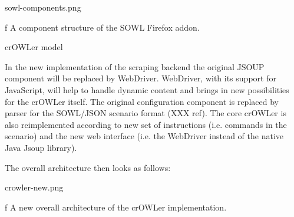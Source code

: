 \midinsert
\picw=12cm \cinspic sowl-components.png
\caption/f A component structure of the SOWL Firefox addon. 
\endinsert


\secc crOWLer model

In the new implementation of the scraping backend the original JSOUP component
will be replaced by WebDriver. WebDriver, with its support for JavaScript,
will help to handle dynamic content and brings in new possibilities for the
crOWLer itself. The original configuration component is replaced by parser for
the SOWL/JSON scenario format (XXX ref).  The core crOWLer is also
reimplemented according to new set of instructions (i.e. commands in the
scenario) and the new web interface (i.e. the WebDriver instead of the native
Java Jsoup library). 

The overall architecture then looks as follows: 

\midinsert
\picw=7.5cm \cinspic crowler-new.png
\caption/f A new overall architecture of the crOWLer implementation. 
\endinsert



%





